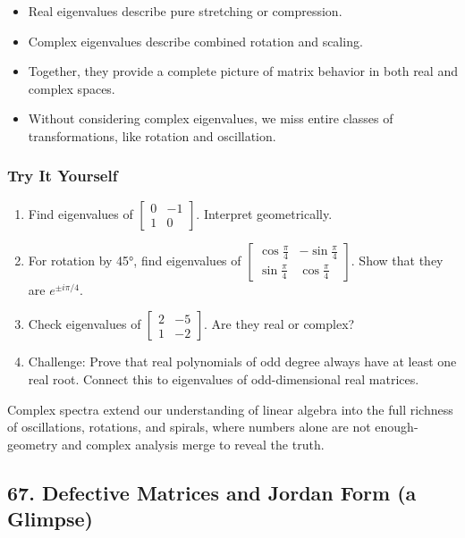 \documentclass[
  letterpaper,
  DIV=11,
  numbers=noendperiod]{scrreprt}
\providecommand{\tightlist}{%
  \setlength{\itemsep}{0pt}\setlength{\parskip}{0pt}}
\begin{document}
\begin{itemize}
\tightlist
\item
  Real eigenvalues describe pure stretching or compression.
\item
  Complex eigenvalues describe combined rotation and scaling.
\item
  Together, they provide a complete picture of matrix behavior in both
  real and complex spaces.
\item
  Without considering complex eigenvalues, we miss entire classes of
  transformations, like rotation and oscillation.
\end{itemize}

\subsubsection{Try It Yourself}\label{try-it-yourself-65}

\begin{enumerate}
\def\labelenumi{\arabic{enumi}.}
\tightlist
\item
  Find eigenvalues of \(\begin{bmatrix} 0 & -1 \\ 1 & 0 \end{bmatrix}\).
  Interpret geometrically.
\item
  For rotation by 45°, find eigenvalues of
  \(\begin{bmatrix} \cos\frac{\pi}{4} & -\sin\frac{\pi}{4} \\ \sin\frac{\pi}{4} & \cos\frac{\pi}{4} \end{bmatrix}\).
  Show that they are \(e^{\pm i\pi/4}\).
\item
  Check eigenvalues of
  \(\begin{bmatrix} 2 & -5 \\ 1 & -2 \end{bmatrix}\). Are they real or
  complex?
\item
  Challenge: Prove that real polynomials of odd degree always have at
  least one real root. Connect this to eigenvalues of odd-dimensional
  real matrices.
\end{enumerate}

Complex spectra extend our understanding of linear algebra into the full
richness of oscillations, rotations, and spirals, where numbers alone
are not enough-geometry and complex analysis merge to reveal the truth.

\subsection{67. Defective Matrices and Jordan Form (a
Glimpse)}\label{defective-matrices-and-jordan-form-a-glimpse}
\end{document}
